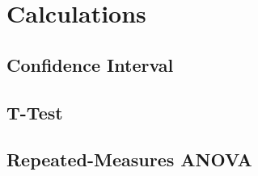 \documentclass[a4paper]{article}
\begin{document}

\section{Calculations} %
\label{sec:calculations}

\subsection{Confidence Interval} %
\label{sub:confidence_interval}


\subsection{T-Test} %
\label{sub:t_test}


\subsection{Repeated-Measures ANOVA} %
\label{sub:repeated_measures_anova}



\custombibliography
\end{document}
